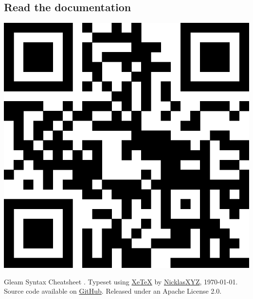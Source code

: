 \vs
\subsection*{\rmfamily Read the documentation}
\medskip
{
  \hspace{0.3333\linewidth}
  \includegraphics[height=0.15\paperheight]{img/gleam-qr.eps}
}

\medskip
\vfill
{\scriptsize
  Gleam {\gleamv} Syntax Cheatsheet {\posterv}.
  Typeset using \href{https://tug.org/xetex/}{XeTeX} by 
  \href{https://github.com/NicklasXYZ/}{NicklasXYZ}, \today.
  Source code available on \href{https://github.com/NicklasXYZ/gleam\_cheatsheets/}{GitHub}.
  Released under an Apache License 2.0.
\par}

